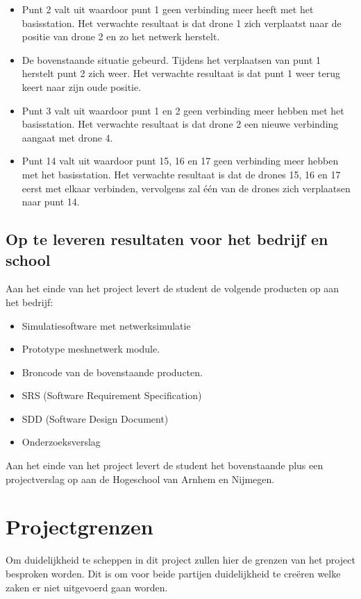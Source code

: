 \documentclass[a4paper, 11pt, oneside]{report}
\begin{document}
\begin{itemize}
	\item Punt 2 valt uit waardoor punt 1 geen verbinding meer heeft met het basisstation. Het verwachte resultaat is dat drone 1 zich verplaatst naar de positie van drone 2 en zo het netwerk herstelt.
	\item De bovenstaande situatie gebeurd. Tijdens het verplaatsen van punt 1 herstelt punt 2 zich weer. Het verwachte resultaat is dat punt 1 weer terug  keert naar zijn oude positie.
	\item Punt 3 valt uit waardoor punt 1 en 2 geen verbinding meer hebben met het basisstation. Het verwachte resultaat is dat drone 2 een nieuwe verbinding aangaat met drone 4.
	\item Punt 14 valt uit waardoor punt 15, 16 en 17 geen verbinding meer hebben met het basisstation. Het verwachte resultaat is dat de drones 15, 16 en 17 eerst met elkaar verbinden, vervolgens zal één van de drones zich verplaatsen naar punt 14. 
\end{itemize}

\section[Op te leveren resultaten]{Op te leveren resultaten voor het bedrijf en school}

Aan het einde van het project levert de student de volgende producten op aan het bedrijf:

\begin{itemize}
\item Simulatiesoftware met netwerksimulatie
\item Prototype meshnetwerk module.
\item Broncode van de bovenstaande producten. 
\item SRS (Software Requirement Specification)
\item SDD (Software Design Document)
\item Onderzoeksverslag
\end{itemize}

Aan het einde van het project levert de student het bovenstaande plus een projectverslag op aan de Hogeschool van Arnhem en Nijmegen.

\chapter{Projectgrenzen}
\label{chapter:projectgrenzen}
Om duidelijkheid te scheppen in dit project zullen hier de grenzen van het project besproken worden.
Dit is om voor beide partijen duidelijkheid te creëren welke zaken er niet uitgevoerd gaan worden. 
\end{document}

